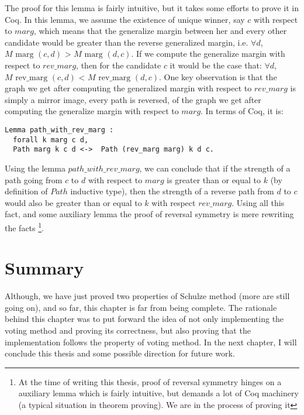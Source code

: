 The proof for this lemma is fairly intuitive, but it takes some efforts to prove it in Coq. 
In this lemma, we assume the 
existence of unique winner, say $c$ with respect to $marg$, which means that the generalize 
margin between her and every other candidate would be greater than the reverse generalized 
margin, i.e.  $\forall d$, $M \text{ marg } (c, d)$ > $M \text{ marg } (d, c)$. 
If we compute the generalize margin with respect to $rev\_marg$, then 
for the candidate $c$ it would be the case that:  
$\forall d$, $M \text{ rev\_marg } (c, d)$ <  $M \text{ rev\_marg } (d, c)$. 
One key observation is that the graph we get after computing the generalized margin with respect to $rev\_marg$ is 
simply a mirror image, every path is reversed, of the graph we get after computing the generalize margin with respect to $marg$. 
In terms of Coq, it is:
\begin{verbatim}
Lemma path_with_rev_marg :
  forall k marg c d,
  Path marg k c d <->  Path (rev_marg marg) k d c.
\end{verbatim}

Using the lemma $path\_with\_rev\_marg$, we can conclude that if the strength of 
a path going from $c$ to $d$ with respect to $marg$ is greater than or equal to $k$ 
(by definition of $Path$ inductive type), then the strength of a reverse path from $d$ to 
$c$ would also be greater than or equal to $k$ with respect $rev\_marg$. 
Using all this fact, and some auxiliary  lemma 
the proof of reversal symmetry is mere rewriting the facts
\footnote{At the time of writing this thesis, proof of reversal 
symmetry hinges on a auxiliary lemma which 
is fairly intuitive, but demands a lot of  Coq machinery (a typical situation 
in theorem proving). We are in the process of proving it}. 

 	
 
 \section{Summary}
 Although, we have just proved two properties of Schulze method (more are still going on), and so far, this chapter 
 is far from being complete. The rationale behind this chapter was to put forward the idea of 
 not only implementing the voting method and proving its correctness, but also proving that the implementation 
 follows the property of voting method. In the next chapter, I will conclude this thesis and some possible 
 direction for future work.  
 
 
 